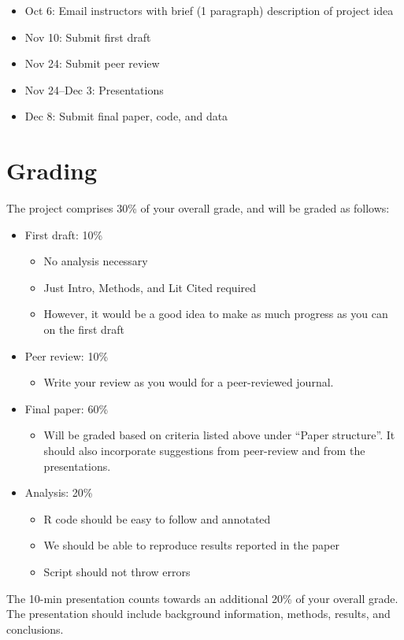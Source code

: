 \documentclass[12pt]{article}
\begin{document}
\begin{itemize}
  \item Oct 6: Email instructors with brief (1 paragraph) description
    of project idea
  \item Nov 10: Submit first draft
  \item Nov 24: Submit peer review
  \item Nov 24--Dec 3: Presentations
  \item Dec 8: Submit final paper, code, and data
\end{itemize}


\section*{Grading}

The project comprises 30\% of your overall grade, and will be graded as follows:

\begin{itemize}
  \item First draft: 10\%
    \begin{itemize}
      \item No analysis necessary
      \item Just Intro, Methods, and Lit Cited required
      \item However, it would be a good idea to make as much progress
        as you can on the first draft
    \end{itemize}
  \item Peer review: 10\%
    \begin{itemize}
      \item Write your review as you would for a peer-reviewed journal.
    \end{itemize}
  \item Final paper: 60\%
    \begin{itemize}
      \item Will be graded based on criteria listed above under
        ``Paper structure''. It should also incorporate suggestions from
        peer-review and from the presentations.
    \end{itemize}
  \item Analysis: 20\%
    \begin{itemize}
      \item R code should be easy to follow and annotated
      \item We should be able to reproduce results reported in the paper
      \item Script should not throw errors
    \end{itemize}
\end{itemize}

The 10-min presentation counts towards an additional 20\% of your
overall grade. The presentation should include background information,
methods, results, and conclusions.   
\end{document}
